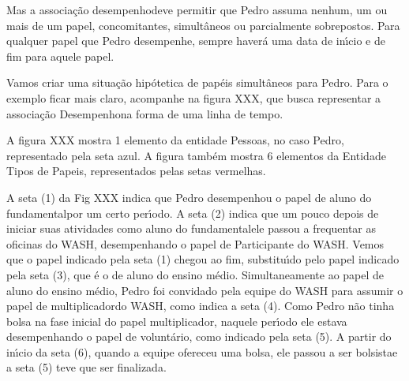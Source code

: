 \documentclass[
12pt,		%
openright,	%
twoside,  %
a4paper,			%
chapter=TITLE,		%
english,			%
french,				%
spanish,			%
brazil				%
]{USPSC-classe/USPSC}
\begin{document}
Mas a associa\c{c}\~ao \textquotedbl desempenho\textquotedbl  deve permitir que Pedro assuma nenhum, um ou mais de um papel, concomitantes, simult\^aneos ou parcialmente sobrepostos. Para qualquer papel que Pedro desempenhe, sempre haver\'a uma data de in\'{\i}cio e de fim para aquele papel.


Vamos criar uma situa\c{c}\~ao hip\'otetica de pap\'eis simult\^aneos para Pedro. Para o exemplo ficar mais claro, acompanhe na figura XXX, que busca representar a associa\c{c}\~ao \textquotedbl Desempenho\textquotedbl  na forma de uma linha de tempo.


A figura XXX mostra 1 elemento da entidade \textquotedbl Pessoas\textquotedbl , no caso \textquotedbl Pedro\textquotedbl , representado pela seta azul. A figura tamb\'em mostra 6 elementos da Entidade \textquotedbl Tipos de Papeis\textquotedbl , representados pelas setas vermelhas.


A seta (1) da Fig XXX indica que Pedro desempenhou o papel de \textquotedbl aluno do fundamental\textquotedbl  por um certo per\'{\i}odo. A seta (2) indica que um pouco depois de iniciar suas atividades como \textquotedbl aluno do fundamental\textquotedbl  ele passou a frequentar as oficinas do WASH, desempenhando o papel de \textquotedbl Participante do WASH\textquotedbl . Vemos que o papel indicado pela seta (1) chegou ao fim, substitu\'{\i}do pelo papel indicado pela seta (3), que \'e o de \textquotedbl aluno do ensino m\'edio\textquotedbl . Simultaneamente ao papel de \textquotedbl aluno do ensino m\'edio\textquotedbl , Pedro foi convidado pela equipe do WASH para assumir o papel de \textquotedbl multiplicador\textquotedbl  do WASH, como indica a seta (4). Como Pedro n\~ao tinha bolsa na fase inicial do papel \textquotedbl multiplicador\textquotedbl , naquele per\'{\i}odo ele estava desempenhando o papel de \textquotedbl volunt\'ario\textquotedbl , como indicado pela seta (5). A partir do in\'{\i}cio da seta (6), quando a equipe ofereceu uma bolsa, ele passou a ser \textquotedbl bolsista\textquotedbl  e a seta (5) teve que ser finalizada.
\end{document}
